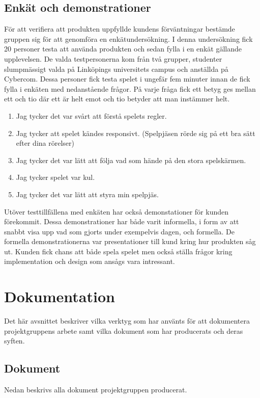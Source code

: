 \subsection{Enkät och demonstrationer}
\label{sec:method-poll}
För att verifiera att produkten uppfyllde kundens förväntningar bestämde gruppen sig för att genomföra en enkätundersökning. I denna undersökning fick 20 personer testa att använda produkten och sedan fylla i en enkät gällande upplevelsen. De valda testpersonerna kom från två grupper, studenter slumpmässigt valda på Linköpings universitets campus och anställda på Cybercom. Dessa personer fick testa spelet i ungefär fem minuter innan de fick fylla i enkäten med nedanstående frågor. På varje fråga fick ett betyg ges mellan ett och tio där ett är helt emot och tio betyder att man instämmer helt.


\begin{enumerate}[label={(\alph*)}]
	\item Jag tycker det var svårt att förstå spelets regler.
	\item Jag tycker att spelet kändes responsivt. (Spelpjäsen rörde sig på ett bra sätt efter dina rörelser)
	\item Jag tycker det var lätt att följa vad som hände på den stora spelskärmen.
	\item Jag tycker spelet var kul.
	\item Jag tycker det var lätt att styra min spelpjäs.
\end{enumerate}

Utöver testtillfällena med enkäten har också demonstationer för kunden förekommit. Dessa demonstrationer har både varit informella, i form av att snabbt visa upp vad som gjorts under exempelvis dagen, och formella. De formella demonstrationerna var presentationer till kund kring hur produkten såg ut. Kunden fick chans att både spela spelet men också ställa frågor kring implementation och design som ansågs vara intressant.

\pagebreak

\section{Dokumentation}
\label{sec:method-documentation}
Det här avsnittet beskriver vilka verktyg som har använts för att dokumentera projektgruppens arbete samt vilka dokument som har producerats och deras syften.

\subsection{Dokument}
Nedan beskrivs alla dokument projektgruppen producerat.

